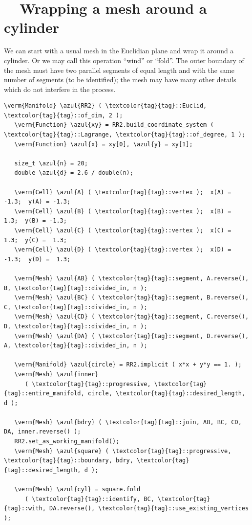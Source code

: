 \section{~~Wrapping a mesh around a cylinder}\label{\numb section 7.\numb parag 14}

We can start with a usual mesh in the Euclidian plane and wrap it around a cylinder.
Or we may call this operation ``wind'' or ``fold''.
The outer boundary of the mesh must have two parallel segments of equal length and with
the same number of segments (to be identified); the mesh may have many other details
which do not interfere in the process.

\begin{Verbatim}[commandchars=\\\{\},formatcom=\small\tt,frame=single,
   label=parag-\ref{\numb section 7.\numb parag 14}.cpp,rulecolor=\color{coment},
   baselinestretch=0.94,framesep=2mm                                             ]
   \verm{Manifold} \azul{RR2} ( \textcolor{tag}{tag}::Euclid, \textcolor{tag}{tag}::of_dim, 2 );
   \verm{Function} \azul{xy} = RR2.build_coordinate_system ( \textcolor{tag}{tag}::Lagrange, \textcolor{tag}{tag}::of_degree, 1 );
   \verm{Function} \azul{x} = xy[0], \azul{y} = xy[1];

   size_t \azul{n} = 20;
   double \azul{d} = 2.6 / double(n);

   \verm{Cell} \azul{A} ( \textcolor{tag}{tag}::vertex );  x(A) = -1.3;  y(A) = -1.3;
   \verm{Cell} \azul{B} ( \textcolor{tag}{tag}::vertex );  x(B) =  1.3;  y(B) = -1.3;
   \verm{Cell} \azul{C} ( \textcolor{tag}{tag}::vertex );  x(C) =  1.3;  y(C) =  1.3;
   \verm{Cell} \azul{D} ( \textcolor{tag}{tag}::vertex );  x(D) = -1.3;  y(D) =  1.3;

   \verm{Mesh} \azul{AB} ( \textcolor{tag}{tag}::segment, A.reverse(), B, \textcolor{tag}{tag}::divided_in, n );
   \verm{Mesh} \azul{BC} ( \textcolor{tag}{tag}::segment, B.reverse(), C, \textcolor{tag}{tag}::divided_in, n );
   \verm{Mesh} \azul{CD} ( \textcolor{tag}{tag}::segment, C.reverse(), D, \textcolor{tag}{tag}::divided_in, n );
   \verm{Mesh} \azul{DA} ( \textcolor{tag}{tag}::segment, D.reverse(), A, \textcolor{tag}{tag}::divided_in, n );

   \verm{Manifold} \azul{circle} = RR2.implicit ( x*x + y*y == 1. );
   \verm{Mesh} \azul{inner}
      ( \textcolor{tag}{tag}::progressive, \textcolor{tag}{tag}::entire_manifold, circle, \textcolor{tag}{tag}::desired_length, d );

   \verm{Mesh} \azul{bdry} ( \textcolor{tag}{tag}::join, AB, BC, CD, DA, inner.reverse() );
   RR2.set_as_working_manifold();
   \verm{Mesh} \azul{square} ( \textcolor{tag}{tag}::progressive, \textcolor{tag}{tag}::boundary, bdry, \textcolor{tag}{tag}::desired_length, d );

   \verm{Mesh} \azul{cyl} = square.fold
      ( \textcolor{tag}{tag}::identify, BC, \textcolor{tag}{tag}::with, DA.reverse(), \textcolor{tag}{tag}::use_existing_vertices );
\end{Verbatim}

